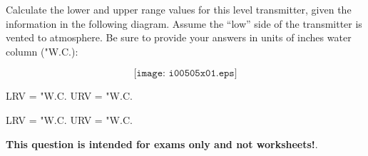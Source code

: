 

Calculate the lower and upper range values for this level transmitter, given the information in the following diagram.  Assume the ``low'' side of the transmitter is vented to atmosphere.  Be sure to provide your answers in units of inches water column ("W.C.):

$$\texttt{[image: i00505x01.eps]}$$

LRV = \underbar{\hskip 50pt} "W.C. \hskip 100pt URV = \underbar{\hskip 50pt} "W.C.







LRV =  "W.C. \hskip 100pt URV =  "W.C.







{\bf This question is intended for exams only and not worksheets!}.



